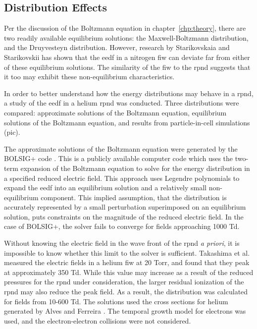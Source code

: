 \subsection{Distribution Effects}

Per the discussion of the Boltzmann equation in chapter~\ref{chp:theory}, there
are two readily available equilibrium solutions: the Maxwell-Boltzmann
distribution, and the Druyvesteyn distribution. However, research by
Starikovskaia and Starikovskii \cite{Starikovskaia2001} has shown that the
\acs{eedf} in a nitrogen \acs{fiw} can deviate far from either of these
equilibrium solutions. The similarity of the \acs{fiw} to the \acs{rpnd}
suggests that it too may exhibit these non-equilibrium characteristics.

In order to better understand how the energy distributions may behave in a
\acs{rpnd}, a study of the \acs{eedf} in a helium \acs{rpnd} was conducted.
Three distributions were compared: approximate solutions of the Boltzmann
equation, equilibrium solutions of the Boltzmann equation, and results from
particle-in-cell simulations (\acs{pic}).

The approximate solutions of the Boltzmann equation were generated by the
BOLSIG+ code \cite{Hagelaar2005}. This is a publicly available computer code
which uses the two-term expansion of the Boltzmann equation to solve for the
energy distribution in a specified reduced electric field. This approach uses
Legendre polynomials to expand the \acs{eedf} into an equilibrium solution and a
relatively small non-equilibrium component. This implied assumption, that the
distribution is accurately represented by a small perturbation superimposed on
an equilibrium solution, puts constraints on the magnitude of the reduced
electric field. In the case of BOLSIG+, the solver fails to converge for fields
approaching 1000 Td.

Without knowing the electric field in the wave front of the \acs{rpnd} \emph{a
priori}, it is impossible to know whether this limit to the solver is
sufficient. Takashima et al. \cite{Takashima2011} measured the electric fields
in a helium \acs{fiw} at 20 Torr, and found that they peak at approximately 350
Td. While this value may increase as a result of the reduced pressures for the
\acs{rpnd} under consideration, the larger residual ionization of the \acs{rpnd}
may also reduce the peak field. As a result, the distribution was calculated for
fields from 10-600 Td. The solutions used the cross sections for helium
generated by Alves and Ferreira \cite{Alves2013}. The temporal growth model for
electrons was used, and the electron-electron collisions were not considered.

